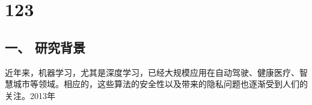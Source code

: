 \chapter{123}

\section{一、 研究背景}
	近年来，机器学习，尤其是深度学习，已经大规模应用在自动驾驶、健康医疗、智慧城市等领域。相应的，这些算法的安全性以及带来的隐私问题也逐渐受到人们的关注。2013年\cite{szegedy2014}